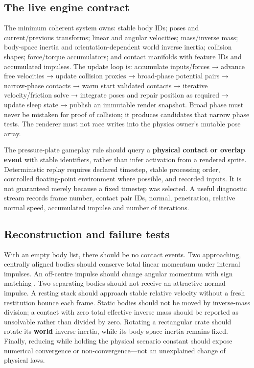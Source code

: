 \subsection{The live engine contract}\label{06-engine-ii-ch033-the-live-engine-contract}

\hypertarget{06-engine-ii-ch033-the-live-engine-contract}{}

The minimum coherent system owns: stable body IDs; poses and current/previous transforms; linear and angular velocities; mass/inverse mass; body-space inertia and orientation-dependent world inverse inertia; collision shapes; force/torque accumulators; and contact manifolds with feature IDs and accumulated impulses. The update loop is: accumulate inputs/forces → advance free velocities → update collision proxies → broad-phase potential pairs → narrow-phase contacts → warm start validated contacts → iterative velocity/friction solve → integrate poses and repair position as required → update sleep state → publish an immutable render snapshot. Broad phase must never be mistaken for proof of collision; it produces candidates that narrow phase tests. The renderer must not race writes into the physics owner's mutable pose array.

The pressure-plate gameplay rule should query a \textbf{physical contact or overlap event} with stable identifiers, rather than infer activation from a rendered sprite. Deterministic replay requires declared timestep, stable processing order, controlled floating-point environment where possible, and recorded inputs. It is not guaranteed merely because a fixed timestep was selected. A useful diagnostic stream records frame number, contact pair IDs, normal, penetration, relative normal speed, accumulated impulse and number of iterations.

\subsection{Reconstruction and failure tests}\label{06-engine-ii-ch033-reconstruction-and-failure-tests}

\hypertarget{06-engine-ii-ch033-reconstruction-and-failure-tests}{}

With an empty body list, there should be no contact events. Two approaching, centrally aligned bodies should conserve total linear momentum under internal impulses. An off-centre impulse should change angular momentum with sign matching . Two separating bodies should not receive an attractive normal impulse. A resting stack should approach stable relative velocity without a fresh restitution bounce each frame. Static bodies should not be moved by inverse-mass division; a contact with zero total effective inverse mass should be reported as unsolvable rather than divided by zero. Rotating a rectangular crate should rotate its \textbf{world} inverse inertia, while its body-space inertia remains fixed. Finally, reducing  while holding the physical scenario constant should expose numerical convergence or non-convergence---not an unexplained change of physical laws.

